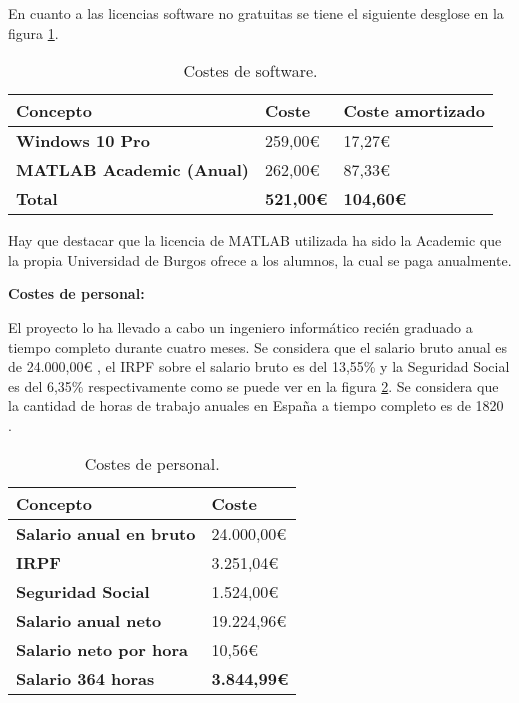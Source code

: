 En cuanto a las licencias software no gratuitas se tiene el siguiente desglose en la figura \ref{tabla:costes-de-software}.

\begin{table}[h!]
    \centering
    \begin{tabular}{l l l}
        \hline
        \textbf{Concepto}                   & \textbf{Coste}        & \textbf{Coste amortizado} \\
        \hline
        \textbf{Windows 10 Pro}             & 259,00€               & 17,27€                    \\
        \textbf{MATLAB Academic (Anual)}    & 262,00€               & 87,33€                    \\
        \hline
        \textbf{Total}                      & \textbf{521,00€}      & \textbf{104,60€}          \\
        \hline
    \end{tabular}
    \caption{Costes de software.}\label{tabla:costes-de-software}
\end{table}

Hay que destacar que la licencia de MATLAB utilizada ha sido la Academic que la propia Universidad de Burgos ofrece a los alumnos, la cual se paga anualmente.

\textbf{Costes de personal:}

El proyecto lo ha llevado a cabo un ingeniero informático recién graduado a tiempo completo durante cuatro meses. Se considera que el salario bruto anual es de 24.000,00€ \cite{sueldoIIespaña}, el IRPF sobre el salario bruto es del 13,55\% y la Seguridad Social es del 6,35\% respectivamente como se puede ver en la figura \ref{tabla:costes-de-personal}. Se considera que la cantidad de horas de trabajo anuales en España a tiempo completo es de 1820 \cite{horasAnuales}.

\begin{table}[h!]
    \centering
    \begin{tabular}{l l}
        \hline
        \textbf{Concepto}                   & \textbf{Coste}        \\
        \hline
        \textbf{Salario anual en bruto}     & 24.000,00€            \\
        \textbf{IRPF}                       & 3.251,04€             \\
        \textbf{Seguridad Social}           & 1.524,00€             \\
        \textbf{Salario anual neto}         & 19.224,96€            \\
        \textbf{Salario neto por hora}      & 10,56€                \\
        \hline
        \textbf{Salario 364 horas}          & \textbf{3.844,99€}    \\
        \hline
    \end{tabular}
    \caption{Costes de personal.}\label{tabla:costes-de-personal}
\end{table}

